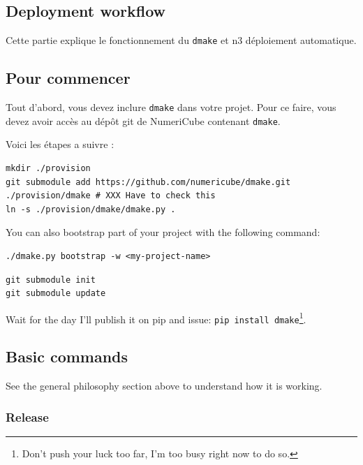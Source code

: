 \subsection{Deployment workflow}

Cette partie explique le fonctionnement du \texttt{dmake}
et \gls{n3} déploiement automatique.


\subsection{Pour commencer}

Tout d’abord, vous devez inclure \texttt{dmake} dans votre projet.
Pour ce faire, vous devez avoir accès au dépôt git de NumeriCube contenant \texttt{dmake}.

Voici les étapes a suivre :
\begin{lstlisting}[style=bash,caption={How to include dmake in your project}]
mkdir ./provision
git submodule add https://github.com/numericube/dmake.git ./provision/dmake # XXX Have to check this
ln -s ./provision/dmake/dmake.py .
\end{lstlisting}

You can also bootstrap part of your project with the following command:
\begin{lstlisting}[style=bash]
./dmake.py bootstrap -w <my-project-name>
\end{lstlisting}


\begin{lstlisting}[style=bash]
git submodule init
git submodule update
\end{lstlisting}

Wait for the day I'll publish it on pip and issue: \texttt{pip install dmake}\footnote{Don't push your luck
too far, I'm too busy right now to do so.}.

\subsection{Basic commands}

See the general philosophy section above to understand how it is working.

\subsubsection{Release}

